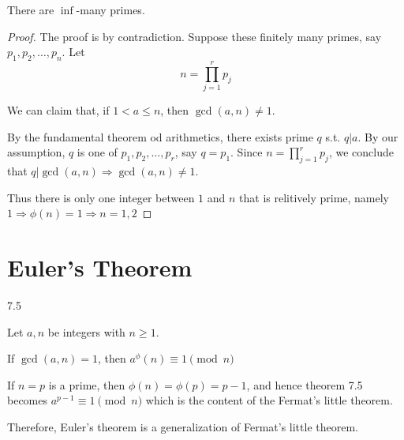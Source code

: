 \begin{corollary}
    There are $\inf$-many primes.
\end{corollary}
\begin{proof}
    The proof is by contradiction. Suppose these finitely many primes, say $p_1, p_2, \ldots, p_n$.
    Let
    \[
        n = \prod_{j=1}^{r}p_j
    \]

    We can claim that, if $1 < a \leq n$, then $\gcd(a, n) \neq 1$.

    By the fundamental theorem od arithmetics, there exists prime $q$ s.t. $q | a$.
    By our assumption, $q$ is one of $p_1, p_2, \dots, p_r$, say $q = p_1$.
    Since $n = \prod_{j=1}^{r}p_j$, we conclude that $q | \gcd(a, n) \Rightarrow \gcd(a, n) \neq 1$.

    Thus there is only one integer between $1$ and $n$ that is relitively prime, namely $1 \Rightarrow \phi(n) = 1 \Rightarrow n = 1, 2$
\end{proof}

\setcounter{section}{2}
\section{Euler's Theorem}

\begin{theorem}
    7.5

    Let $a, n$ be integers with $n \geq 1$.

    If $\gcd(a, n) = 1$, then $a^\phi(n) \equiv 1 \pmod n$

\end{theorem}
\begin{remark}
    If $n = p$ is a prime, then $\phi(n) = \phi(p) = p - 1$, and hence theorem 7.5 becomes $a^{p-1} \equiv 1 \pmod n$
    which is the content of the Fermat's little theorem.

    Therefore, Euler's theorem is a generalization of Fermat's little theorem.
\end{remark}

